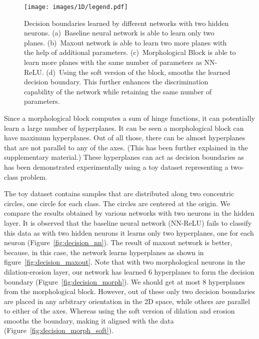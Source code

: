 \documentclass{bmvc2k}
\def\figref#1{figure~\ref{#1}}
\def\Figref#1{Figure~\ref{#1}}
\begin{document}
\begin{figure}
    \centering
    \texttt{[image: images/1D/legend.pdf]}
    \smallskip
    
\caption{Decision boundaries learned by different networks with two hidden neurons. (a)~Baseline neural network is able to learn only two planes. 
(b)~Maxout network is able to learn two more planes with the help of additional parameters. 
(c)~Morphological Block is able to learn more planes with the same number of parameters as NN-ReLU. 
(d)~Using the soft version of the block, smooths the learned decision boundary. 
This further enhances the discrimination capability of the network while retaining the same number of parameters.}
    \label{fig:pmap_circle}
\end{figure}

Since a morphological block computes a sum of hinge functions, it can potentially learn a large number of hyperplanes. It can be seen a morphological block can have maximum   hyperplanes. Out of all those, there can be almost  hyperplanes that are not parallel to any of the axes. (This has been further explained in the supplementary material.) These hyperplanes can act as decision boundaries as has been demonstrated experimentally using a toy dataset representing a two-class problem. 

The toy dataset contains samples that are distributed along two concentric circles, one circle for each class. The circles are centered at the origin.
We compare the results obtained by various networks with two neurons in the hidden layer. It is observed that the baseline neural network (NN-ReLU) fails to classify this data as with two hidden neurons it learns only two hyperplanes, one for each neuron (\Figref{fig:decision_nn}).
The result of maxout network\cite{goodfellow_maxout_2013} is better, because, in this case, the network learns  hyperplanes as shown in \figref{fig:decision_maxout}. 
Note that with two morphological neurons in the dilation-erosion layer, our network has learned 6 hyperplanes to form the decision boundary (\Figref{fig:decision_morph}). We should get at most 8 hyperplanes from the morphological block. However, out of these only two decision boundaries are placed in any arbitrary orientation in the 2D space, while others are parallel to either of the axes. Whereas using the soft version of dilation and erosion smooths the boundary, making it aligned with the data (\Figref{fig:decision_morph_soft}). 
\end{document}
